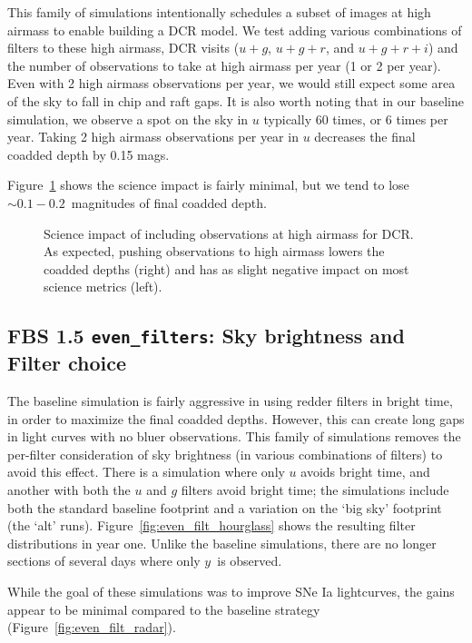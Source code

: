 This family of simulations intentionally schedules a subset of images at high airmass to enable building a DCR model. We test adding various combinations of filters to these high airmass, DCR visits ($u+g$, $u+g+r$, and $u+g+r+i$) and the number of observations to take at high airmass per year (1 or 2 per year).  Even with 2 high airmass observations per year, we would still expect some area of the sky to fall in chip and raft gaps.  It is also worth noting that in our baseline simulation, we observe a spot on the sky in $u$ typically 60 times, or 6 times per year. Taking 2 high airmass observations per year in $u$ decreases the final coadded depth by 0.15 mags.

Figure~\ref{fig:dcr_radar} shows the science impact is fairly minimal, but we tend to lose $\sim0.1-0.2$\ magnitudes of final coadded depth.

\begin{figure}
\caption{Science impact of including observations at high airmass for DCR. As expected, pushing observations to high airmass lowers the coadded depths (right) and has as slight negative impact on most science metrics (left).}\label{fig:dcr_radar}
\end{figure}


\subsection{FBS 1.5 {\tt even\_filters}: Sky brightness and Filter choice}

The baseline simulation is fairly aggressive in using redder filters in bright time, in order to maximize the final coadded depths. However, this can create long gaps in light curves with no bluer observations. This family of simulations removes the per-filter consideration of sky brightness (in various combinations of filters) to avoid this effect. There is a simulation where only $u$ avoids bright time, and another with both the $u$ and $g$ filters avoid bright time; the simulations include both the standard baseline footprint and a variation on the `big sky' footprint (the `alt' runs). Figure~\ref{fig:even_filt_hourglass} shows the resulting filter distributions in year one. Unlike the baseline simulations, there are no longer sections of several days where only $y$\ is observed.

While the goal of these simulations was to improve SNe Ia lightcurves, the gains appear to be minimal compared to the baseline strategy (Figure~\ref{fig:even_filt_radar}). 


